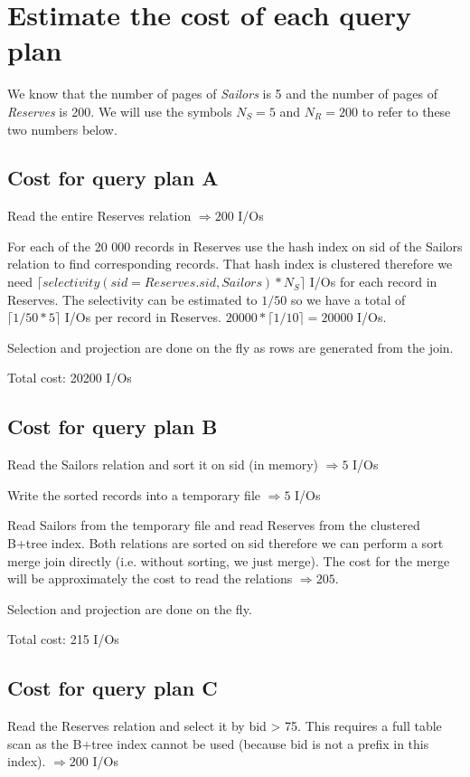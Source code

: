 \documentclass[a4paper,12pt]{article}
\begin{document}
\section[Query cost]{Estimate the cost of each query plan}

We know that the number of pages of \emph{Sailors} is 5 and the number of pages
of \emph{Reserves} is 200.  We will use the symbols $N_S = 5$ and $N_R = 200$
to refer to these two numbers below.

\subsection[Query A]{Cost for query plan A}
Read the entire Reserves relation $ \Rightarrow 200 $ I/Os

For each of the 20 000 records in Reserves use the hash index on sid of the
Sailors relation to find corresponding records.  That hash index is clustered
therefore we need
$ \lceil selectivity(sid = Reserves.sid, Sailors) * N_S \rceil $ I/Os
for each record in Reserves.  The selectivity can be estimated to $ 1/50 $ so
we have a total of $ \lceil 1/50 * 5 \rceil $ I/Os per record in Reserves.
$ 20000 * \lceil 1/10 \rceil = 20000 $ I/Os.

Selection and projection are done on the fly as rows are generated from the
join.

Total cost: 20200 I/Os

\subsection[Query B]{Cost for query plan B}
Read the Sailors relation and sort it on sid (in memory) $ \Rightarrow 5 $ I/Os

Write the sorted records into a temporary file $ \Rightarrow 5 $ I/Os

Read Sailors from the temporary file and read Reserves from the clustered
B+tree index.  Both relations are sorted on sid therefore we can perform a sort
merge join directly (i.e. without sorting, we just merge).  The cost for the
merge will be approximately the cost to read the relations $ \Rightarrow 205 $.

Selection and projection are done on the fly.

Total cost: 215 I/Os

\subsection[Query C]{Cost for query plan C}
Read the Reserves relation and select it by bid > 75.  This requires a full
table scan as the B+tree index cannot be used (because bid is not a prefix in
this index).  $ \Rightarrow 200 $ I/Os
\end{document}
